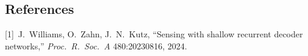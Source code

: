 \documentclass[
     title     = {{Robust Field Reconstruction from Sparse Sensors: SHRED vs SDN vs QR-POD under Sensor Corruption}}
    ,author    = {{Kasper van der Horst and Dimitris Papantzikos}}
    ,subject   = {{Data-Driven Methods for Computational Science and Engineering --- Spring 2026}}
    ,bgcolor   = dtucoolgrey
    ,highlight = dtured
    ,toplogo   = {{tex_dtu_logo_white}}
    ,botlogo   = {{tex_dtu_compute_b_uk}}
    ,papersize = {{a0paper}}
    ,colcount  = {{3columns}}
    ,longtitle
    ,largecaption
]{dtuposter}
\begin{document}
\begin{dtupostercontent}
\section{References}

[1]~J.\ Williams, O.\ Zahn, J.\ N.\ Kutz, ``Sensing with shallow
recurrent decoder networks,'' \textit{Proc.\ R.\ Soc.\ A}
480:20230816, 2024.

\end{dtupostercontent}
\end{document}
